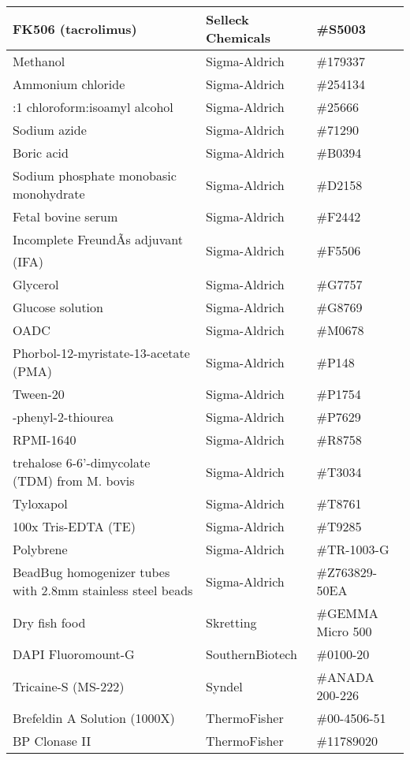 \begin{center}
\begin{longtable}{|>{\raggedright\arraybackslash}m{3in}|>{\raggedleft\arraybackslash}m{1.5in}|>{\raggedright\arraybackslash}m{1in}|}
\hline 
FK506 (tacrolimus) & Selleck Chemicals & \#S5003 \\ 
\hline 
Methanol & Sigma-Aldrich & \#179337 \\ 
\hline 
Ammonium chloride & Sigma-Aldrich & \#254134 \\ 
\hline 
24:1 chloroform:isoamyl alcohol & Sigma-Aldrich & \#25666 \\ 
\hline 
Sodium azide & Sigma-Aldrich  & \#71290 \\ 
\hline 
Boric acid & Sigma-Aldrich  & \#B0394 \\ 
\hline 
Sodium phosphate monobasic monohydrate & Sigma-Aldrich  & \#D2158 \\ 
\hline 
Fetal bovine serum & Sigma-Aldrich  & \#F2442 \\ 
\hline 
Incomplete FreundÃs adjuvant (IFA) & Sigma-Aldrich & \#F5506 \\ 
\hline 
Glycerol & Sigma-Aldrich  & \#G7757 \\ 
\hline 
Glucose solution & Sigma-Aldrich  & \#G8769 \\ 
\hline 
OADC & Sigma-Aldrich  & \#M0678 \\ 
\hline 
Phorbol-12-myristate-13-acetate (PMA) & Sigma-Aldrich  & \#P148 \\ 
\hline 
Tween-20 & Sigma-Aldrich  & \#P1754 \\ 
\hline 
1-phenyl-2-thiourea & Sigma-Aldrich  & \#P7629 \\ 
\hline 
RPMI-1640 & Sigma-Aldrich  & \#R8758 \\ 
\hline 
trehalose 6-6'-dimycolate (TDM) from M. bovis & Sigma-Aldrich  & \#T3034 \\ 
\hline 
Tyloxapol & Sigma-Aldrich  & \#T8761 \\ 
\hline 
100x Tris-EDTA (TE) & Sigma-Aldrich  & \#T9285 \\ 
\hline 
Polybrene & Sigma-Aldrich & \#TR-1003-G \\ 
\hline 
BeadBug homogenizer tubes with 2.8mm stainless steel beads & Sigma-Aldrich & \#Z763829-50EA \\ 
\hline 
Dry fish food & Skretting  & \#GEMMA Micro 500 \\ 
\hline 
DAPI Fluoromount-G & SouthernBiotech  & \#0100-20 \\ 
\hline 
Tricaine-S (MS-222) & Syndel  & \#ANADA 200-226 \\ 
\hline 
Brefeldin A Solution (1000X) & ThermoFisher & \#00-4506-51 \\ 
\hline 
BP Clonase II & ThermoFisher & \#11789020 \\ 

\end{longtable}
\end{center}
